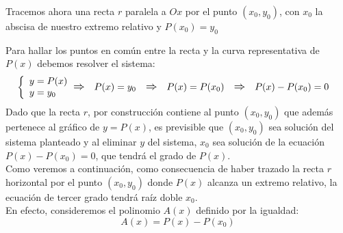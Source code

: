 \documentclass[12pt]{article}
\begin{document}
\begin{center}
\end{center}

Tracemos ahora una recta $r$ paralela a $Ox$ por el punto $({x}_0, {y}_0)$, con ${x}_0$ la abscisa de nuestro extremo relativo y $P({x}_0)={y}_0$

Para hallar los puntos en común entre la recta y la curva representativa de $P(x)$ debemos resolver el sistema:
$$
  \begin{aligned}
    \left\{
    \begin{array}{l}
      y = P(x) \\
      y = {y}_0
    \end{array}
    \right.
     &
    \text{\large$\Rightarrow$}
     &   &
    P(x) = {y}_0
     &   &
    \text{\large$\Rightarrow$}
     &   &
    P(x) = P({x}_0)
     &   &
    \text{\large$\Rightarrow$}
     &   &
    P(x) - P({x}_0) = 0
  \end{aligned}
$$
Dado que la recta $r$, por construcción contiene al punto $({x}_0, {y}_0)$ que además pertenece al gráfico de $y=P(x)$, es previsible que $({x}_0, {y}_0)$ sea solución del sistema planteado y al eliminar $y$ del sistema, ${x}_0$ sea solución de la ecuación $P(x) - P({x}_0) = 0$, que tendrá el grado de $P(x)$. \\
Como veremos a continuación, como consecuencia de haber trazado la recta $r$ horizontal por el punto $({x}_0, {y}_0)$ donde $P(x)$ alcanza un extremo relativo, la ecuación de tercer grado tendrá raíz doble ${x}_0$. \\
En efecto, consideremos el polinomio $A(x)$ definido por la igualdad:
$$
  A(x) = P(x) - P({x}_0)
$$
\end{document}
